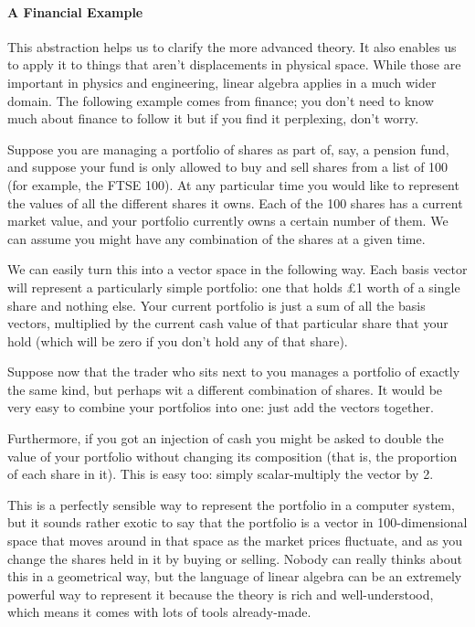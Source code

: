 \documentclass[oneside,english]{amsbook}
\numberwithin{section}{chapter}
\theoremstyle{plain}
\theoremstyle{definition}
\begin{document}
\paragraph{A Financial Example}

This abstraction helps us to clarify the more advanced theory. It also
enables us to apply it to things that aren't displacements in physical
space. While those are important in physics and engineering, linear
algebra applies in a much wider domain. The following example comes from
finance; you don't need to know much about finance to follow it but if
you find it perplexing, don't worry.

Suppose you are managing a portfolio of shares as part of, say, a
pension fund, and suppose your fund is only allowed to buy and sell
shares from a list of 100 (for example, the FTSE 100). At any particular
time you would like to represent the values of all the different shares
it owns. Each of the 100 shares has a current market value, and your
portfolio currently owns a certain number of them. We can assume you
might have any combination of the shares at a given time.

We can easily turn this into a vector space in the following way. Each
basis vector will represent a particularly simple portfolio: one that
holds £1 worth of a single share and nothing else. Your current
portfolio is just a sum of all the basis vectors, multiplied by the
current cash value of that particular share that your hold (which will
be zero if you don't hold any of that share).

Suppose now that the trader who sits next to you manages a portfolio of
exactly the same kind, but perhaps wit a different combination of
shares. It would be very easy to combine your portfolios into one: just
add the vectors together.

Furthermore, if you got an injection of cash you might be asked to
double the value of your portfolio without changing its composition
(that is, the proportion of each share in it). This is easy too: simply
scalar-multiply the vector by 2.

This is a perfectly sensible way to represent the portfolio in a
computer system, but it sounds rather exotic to say that the portfolio
is a vector in 100-dimensional space that moves around in that space as
the market prices fluctuate, and as you change the shares held in it by
buying or selling. Nobody can really thinks about this in a geometrical
way, but the language of linear algebra can be an extremely powerful way
to represent it because the theory is rich and well-understood, which
means it comes with lots of tools already-made.
\end{document}
